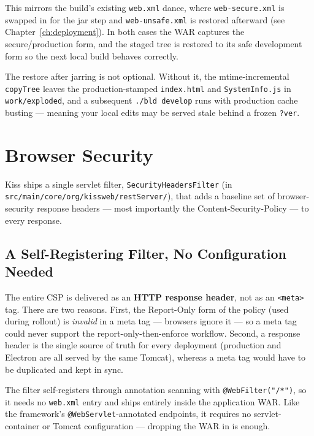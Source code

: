 \noindent
This mirrors the build's existing \texttt{web.xml} dance, where \texttt{web-secure.xml} is swapped in for the jar step and \texttt{web-unsafe.xml} is restored afterward (see Chapter~\ref{ch:deployment}).  In both cases the WAR captures the secure/production form, and the staged tree is restored to its safe development form so the next local build behaves correctly.

\begin{warnbox}
The restore after jarring is not optional.  Without it, the mtime-incremental \texttt{copyTree} leaves the production-stamped \texttt{index.html} and \texttt{SystemInfo.js} in \texttt{work/exploded}, and a subsequent \texttt{./bld develop} runs with production cache busting --- meaning your local edits may be served stale behind a frozen \texttt{?ver}.
\end{warnbox}

\section{Browser Security}
\label{sec:security}

Kiss ships a single servlet filter, \texttt{SecurityHeadersFilter} (in \texttt{src/main/core/org/kissweb/restServer/}), that adds a baseline set of browser-security response headers --- most importantly the Content-Security-Policy --- to every response.

\subsection{A Self-Registering Filter, No Configuration Needed}
\label{sec:security-filter}

The entire CSP is delivered as an \textbf{HTTP response header}, not as an \texttt{<meta>} tag.  There are two reasons.  First, the Report-Only form of the policy (used during rollout) is \emph{invalid} in a meta tag --- browsers ignore it --- so a meta tag could never support the report-only-then-enforce workflow.  Second, a response header is the single source of truth for every deployment (production and Electron are all served by the same Tomcat), whereas a meta tag would have to be duplicated and kept in sync.

The filter self-registers through annotation scanning with \texttt{@WebFilter("/*")}, so it needs no \texttt{web.xml} entry and ships entirely inside the application WAR.  Like the framework's \texttt{@WebServlet}-annotated endpoints, it requires no servlet-container or Tomcat configuration --- dropping the WAR in is enough.

